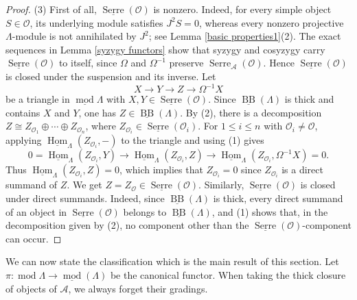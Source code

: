 \documentclass{amsart}
\theoremstyle{definition}
\theoremstyle{remark}
\numberwithin{equation}{thm}
\def\A{\mathcal{A}}
\def\BB{\operatorname{BB}}
\def\Hom{\operatorname{Hom}}
\def\L{\Lambda}
\def\le{\leqslant}
\def\mod{\operatorname{mod}}
\def\O{\mathcal{O}}
\def\Serre{\operatorname{Serre}}
\begin{document}
\begin{proof}
(3) First of all, $\underline{\Serre}(\O)$ is nonzero.  Indeed, for every simple object $S\in\O$, its underlying module satisfies $J^2S=0$, whereas every nonzero projective $\L$-module is not annihilated by $J^2$; see Lemma \ref{basic properties1}(2).
The exact sequences in Lemma \ref{syzygy functors} show that syzygy and cosyzygy carry $\underline{\Serre}(\O)$ to itself, since $\Omega$ and $\Omega^{-1}$ preserve $\Serre_{\A}(\O)$. Hence $\underline{\Serre}(\O)$ is closed under the suspension and its inverse. Let
$$
X\longrightarrow Y\longrightarrow Z\longrightarrow\Omega^{-1}X
$$
be a triangle in $\underline{\mod}\L$ with $X,Y\in\underline{\Serre}(\O)$. 
Since $\underline{\BB}(\L)$ is thick and contains $X$ and $Y$, one has $Z\in\underline{\BB}(\L)$. By (2), there is a decomposition $Z\cong Z_{\O_1}\oplus\cdots\oplus Z_{\O_n}$, where $Z_{\O_i}\in\underline{\Serre}(\O_i)$. 
For $1\le i\le n$ with $\O_i\ne\O$, applying $\underline{\Hom}_\L(Z_{\O_i},-)$ to the triangle and using (1) gives
$$
0=\underline{\Hom}_\L(Z_{\O_i},Y)\to\underline{\Hom}_\L(Z_{\O_i},Z)\to \underline{\Hom}_\L(Z_{\O_i},\Omega^{-1}X)=0.
$$
Thus $\underline{\Hom}_\L(Z_{\O_i},Z)=0$, which implies that $Z_{\O_i}=0$ since $Z_{\O_i}$ is a direct summand of $Z$.
We get $Z=Z_\O\in \underline{\Serre}(\O)$.
Similarly, $\underline{\Serre}(\O)$ is closed under direct summands. Indeed, since $\underline{\BB}(\L)$ is thick, every direct summand of an object in $\underline{\Serre}(\O)$ belongs to $\underline{\BB}(\L)$, and (1) shows that, in the decomposition given by (2), no component other than the $\underline{\Serre}(\O)$-component can occur.
\end{proof}

We can now state the classification which is the main result of this section.
Let $\pi:\mod\L \to \underline{\mod}(\L)$ be the canonical functor.
When taking the thick closure of objects of $\A$, we always forget their gradings.
\end{document}
